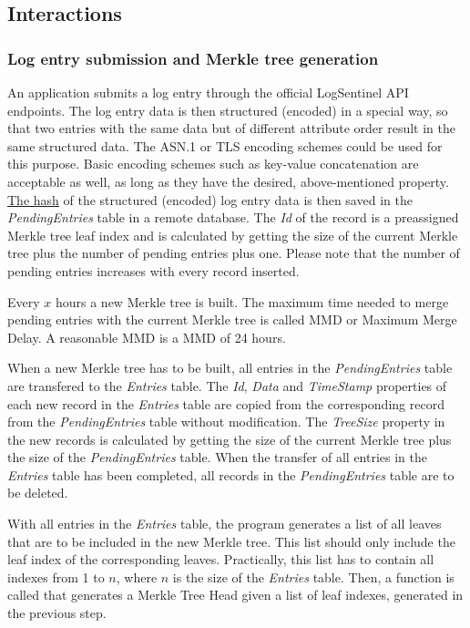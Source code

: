 \documentclass{article}
\begin{document}
    \subsection{Interactions}
    
    \subsubsection{Log entry submission and Merkle tree generation}
    An application submits a log entry through the official LogSentinel API endpoints. The log entry data is then structured (encoded) in a special way, so that two entries with the same data but of different attribute order result in the same structured data. The ASN.1 or TLS encoding schemes could be used for this purpose. Basic encoding schemes such as key-value concatenation are acceptable as well, as long as they have the desired, above-mentioned property. \underline{The hash} of the structured (encoded) log entry data is then saved in the \textit{PendingEntries} table in a remote database.  The \textit{Id} of the record is a preassigned Merkle tree leaf index and is calculated by getting the size of the current Merkle tree plus the number of pending entries plus one. Please note that the number of pending entries increases with every record inserted.
    
	Every $x$ hours a new Merkle tree is built. The maximum time needed to merge pending entries with the current Merkle tree is called MMD or Maximum Merge Delay. A reasonable MMD is a MMD of 24 hours. 
	
	When a new Merkle tree has to be built, all entries in the \textit{PendingEntries} table are transfered to the \textit{Entries} table. The \textit{Id}, \textit{Data} and \textit{TimeStamp} properties of each new record in the \textit{Entries} table are copied from the corresponding record from the \textit{PendingEntries} table without modification. The \textit{TreeSize} property in the new records is calculated by getting the size of the current Merkle tree plus the size of the \textit{PendingEntries} table. When the transfer of all entries in the \textit{Entries} table has been completed, all records in the \textit{PendingEntries} table are to be deleted. 
	
	With all entries in the \textit{Entries} table, the program generates a list of all leaves that are to be included in the new Merkle tree. This list should only include the leaf index of the corresponding leaves. Practically, this list has to contain all indexes from 1 to $ n $, where $ n $ is the size of the \textit{Entries} table. Then, a function is called that generates a Merkle Tree Head given a list of leaf indexes, generated in the previous step. 
	
\end{document}
